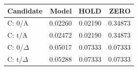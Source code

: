 \begin{tabular}{lrrr}\hline Candidate & Model & HOLD & ZERO\\\hline
C: 0/A & 0.02260 & 0.02190 & 0.34873 \\
C: t/A & 0.02472 & 0.02190 & 0.34873 \\
C: 0/$\Delta$ & 0.05017 & 0.07333 & 0.07333 \\
C: t/$\Delta$ & 0.05288 & 0.07333 & 0.07333 \\
\hline\end{tabular}
